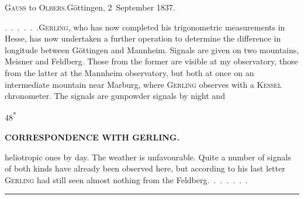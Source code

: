 \begin{center}
\textsc{Gauss} to \textsc{Olbers}.\quad Göttingen, 2~September 1837.
\end{center}

\par\noindent\hspace*{\parindent}\mbox{.\ .\ .\ .\ .\ .}\quad \textsc{Gerling}, who has now completed his trigonometric measurements in Hesse, has now undertaken a further operation to determine the difference in longitude between Göttingen and Mannheim.
Signals are given on two mountains, Meisner and Feldberg. Those from the former are visible at my observatory, those from the latter at the Mannheim observatory, but both at once on an intermediate mountain near Marburg, where \textsc{Gerling} observes with a \textsc{Kessel} chronometer.
The signals are gunpowder signals by night and
\par\smallskip\noindent\hfill{\footnotesize 48\textsuperscript{*}}\hspace*{.12\linewidth}\par
\clearpage
\noindent{}\hfill{\small\textbf{CORRESPONDENCE WITH GERLING.}}\hfill\null\par\medskip
\noindent heliotropic ones by day.
The weather is unfavourable. Quite a number of signals of both kinds have already been observed here, but according to his last letter \textsc{Gerling} had still seen almost nothing from the Feldberg.\ \mbox{.\ .\ .\ .\ .\ .}

\begin{center}\rule{.24\linewidth}{.4pt}\end{center}
